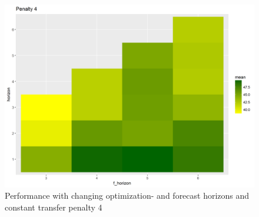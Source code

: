 \begin{figure}[H]
    \centering
    \includegraphics[scale=0.55]{fig/chapter_6/pen_4.png}
    \caption{Performance with changing optimization- and forecast horizons and constant transfer penalty 4}
\label{fig:pen_4}    
\end{figure}

